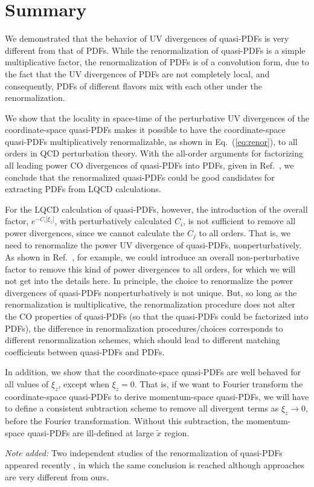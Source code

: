 \section{Summary}
\label{sec:summary}

We demonstrated that the behavior of UV divergences of quasi-PDFs is very different from that of PDFs.  While the renormalization of quasi-PDFs is a simple multiplicative factor, the renormalization of PDFs is of a convolution form, due to the fact that the UV divergences of PDFs are not completely local, and consequently, PDFs of different flavors mix with each other under the renormalization.

We show that the locality in space-time of the perturbative UV divergences of the coordinate-space quasi-PDFs makes it possible to have the coordinate-space quasi-PDFs multiplicatively renormalizable, as shown in Eq.~(\ref{eq:renor}), to all orders in QCD perturbation theory.  With the all-order arguments for factorizing all leading power CO divergences of quasi-PDFs into PDFs, given in Ref.~\cite{Ma:2014jla}, we conclude that the renormalized quasi-PDFs could be good candidates for extracting PDFs from LQCD calculations.

For the LQCD calculation of quasi-PDFs, however, the introduction of the overall factor, $e^{-C_i |\xi_z|}$, with perturbatively calculated $C_i$, is not sufficient to remove all power divergences, since we cannot calculate the $C_j$ to all orders.  That is, we need to renormalize the power UV divergence of quasi-PDFs, nonperturbatively.  As shown in Ref.~\cite{Ishikawa:2016znu}, for example, we could introduce an overall non-perturbative factor to remove this kind of power divergences to all orders, for which we will not get into the details here.  In principle, the choice to renormalize the power divergences of quasi-PDFs nonperturbatively is not unique.  But, so long as the renormalization is multiplicative, the renormalization procedure does not alter the CO properties of quasi-PDFs (so that the quasi-PDFs could be factorized into PDFs), the difference in renormalization procedures/choices corresponds to different renormalization schemes, which should lead to different matching coefficients between quasi-PDFs and PDFs.

In addition, we show that the coordinate-space quasi-PDFs are well behaved for all values of $\xi_z$, except when $\xi_z=0$.  That is,
if we want to Fourier transform the coordinate-space quasi-PDFs to derive momentum-space quasi-PDFs, we will have to define a consistent subtraction scheme to remove all divergent terms as $\xi_z\to 0$, before the Fourier transformation.  Without this subtraction, the momentum-space quasi-PDFs are ill-defined at large $\tilde{x}$ region.

{\it Note added:} Two independent studies of the renormalization of quasi-PDFs appeared recently \cite{Ji:2017oey,Green:2017xeu}, in which the same conclusion is reached although  approaches are very different from ours.
